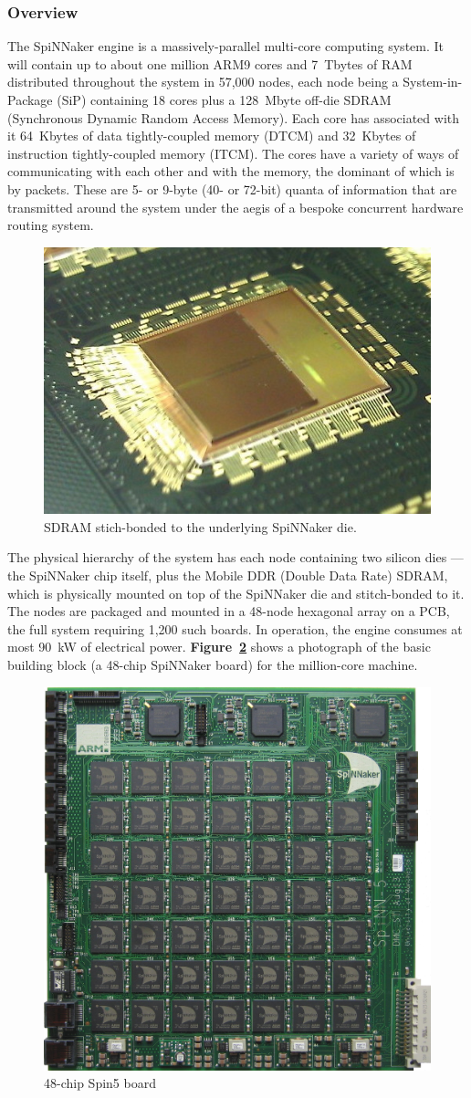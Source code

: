 \documentclass[a4paper, 11pt]{article}
\begin{document}
\subsubsection{Overview}
The SpiNNaker engine is a massively-parallel multi-core computing system. It will contain up to about one million ARM9 cores and 7~Tbytes of RAM distributed throughout the system in 57,000 nodes, each node being a System-in-Package (SiP) containing 18 cores plus a 128~Mbyte off-die SDRAM (Synchronous Dynamic Random Access Memory). Each core has associated with it 64~Kbytes of data tightly-coupled memory (DTCM) and 32~Kbytes of instruction tightly-coupled memory (ITCM). The cores have a variety of ways of communicating with each other and with the memory, the dominant of which is by packets. These are 5- or 9-byte (40- or 72-bit) quanta of information that are transmitted around the system under the aegis of a bespoke concurrent hardware routing system. 

\begin{figure}[htbp]
	\centering
	\includegraphics[width=0.25\linewidth]{images/spinnaker_die.jpg}
	\caption{SDRAM stich-bonded to the underlying SpiNNaker die.}
	\label{fig:spin5}
\end{figure}

The physical hierarchy of the system has each node containing two silicon dies --- the SpiNNaker chip itself, plus the Mobile DDR (Double Data Rate) SDRAM, which is physically mounted on top of the SpiNNaker die and stitch-bonded to it. The nodes are packaged and mounted in a 48-node hexagonal array on a PCB, the full system requiring 1,200 such boards. In operation, the engine consumes at most 90~kW of electrical power. \textbf{Figure~\ref{fig:spin5}} shows a photograph of the basic building block (a 48-chip SpiNNaker board) for the million-core machine.

\begin{figure}[htbp]
	\centering
	\includegraphics[width=0.45\linewidth]{images/spin5.jpg}
	\caption{48-chip Spin5 board}
	\label{fig:spin5}
\end{figure}
\end{document}
